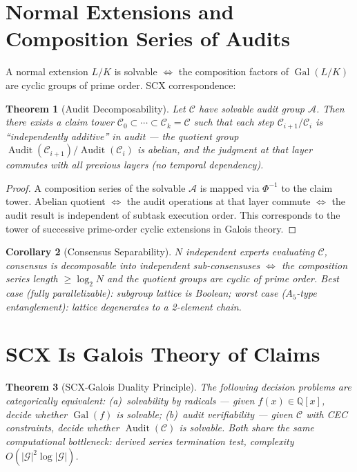 \documentclass[10pt,a4paper]{article}
\newtheorem{theorem}{Theorem}[section]
\newtheorem{corollary}[theorem]{Corollary}
\theoremstyle{remark}
\DeclareMathOperator{\Gal}{Gal}
\DeclareMathOperator{\Audit}{Audit}
\newcommand{\Q}{\mathbb{Q}}
\newcommand{\A}{\mathcal{A}}
\newcommand{\G}{\mathcal{G}}
\newcommand{\cC}{\mathcal{C}}
\begin{document}
\section{Normal Extensions and Composition Series of Audits}

A normal extension $L/K$ is solvable $\iff$ the composition factors of $\Gal(L/K)$ are cyclic groups of prime order. SCX correspondence:

\begin{theorem}[Audit Decomposability]\label{thm:decomposability}
Let $\cC$ have solvable audit group $\A$. Then there exists a claim tower $\cC_0\subset\cdots\subset\cC_k=\cC$ such that each step $\cC_{i+1}/\cC_i$ is ``independently additive'' in audit --- the quotient group $\Audit(\cC_{i+1})/\Audit(\cC_i)$ is abelian, and the judgment at that layer commutes with all previous layers (no temporal dependency).
\end{theorem}

\begin{proof}
A composition series of the solvable $\A$ is mapped via $\Phi^{-1}$ to the claim tower. Abelian quotient $\iff$ the audit operations at that layer commute $\iff$ the audit result is independent of subtask execution order. This corresponds to the tower of successive prime-order cyclic extensions in Galois theory.
\end{proof}

\begin{corollary}[Consensus Separability]\label{cor:separability}
$N$ independent experts evaluating $\cC$, consensus is decomposable into independent sub-consensuses $\iff$ the composition series length $\ge\log_2 N$ and the quotient groups are cyclic of prime order. Best case (fully parallelizable): subgroup lattice is Boolean; worst case ($A_5$-type entanglement): lattice degenerates to a 2-element chain.
\end{corollary}

\section{SCX Is Galois Theory of Claims}

\begin{theorem}[SCX-Galois Duality Principle]\label{thm:meta}
The following decision problems are categorically equivalent: (a)~solvability by radicals --- given $f(x)\in\Q[x]$, decide whether $\Gal(f)$ is solvable; (b)~audit verifiability --- given $\cC$ with CEC constraints, decide whether $\Audit(\cC)$ is solvable. Both share the same computational bottleneck: derived series termination test, complexity $O(|\G|^2\log|\G|)$.
\end{theorem}
\end{document}
